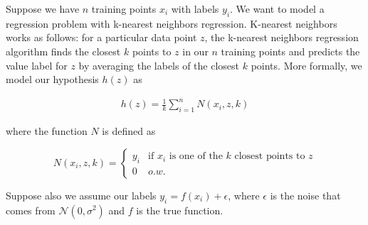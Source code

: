
Suppose we have $n$ training points $x_i$ with labels $y_i$. We want to model a regression problem with k-nearest neighbors regression. K-nearest neighbors works as follows: for a particular data point $z$, the k-nearest neighbors regression algorithm finds the closest $k$ points to $z$ in our $n$ training points and predicts the value label for $z$ by averaging the labels of the closest $k$ points. More formally, we model our hypothesis $h(z)$ as

\begin{align*}
h(z) = \frac{1}{k} \sum_{i=1}^n N(x_i, z, k)
\end{align*}

where the function $N$ is defined as

\[
N(x_i, z, k) = 
\begin{cases} 
      y_i & \text{if } x_i \text{ is one of the } k \text{ closest points to } z \\
      0 & o.w. 
   \end{cases}
\]


Suppose also we assume our labels $y_i = f(x_i) + \epsilon$, where $\epsilon$ is the noise that comes from $\mathcal{N}(0, \sigma^2)$ and $f$ is the true function. 

